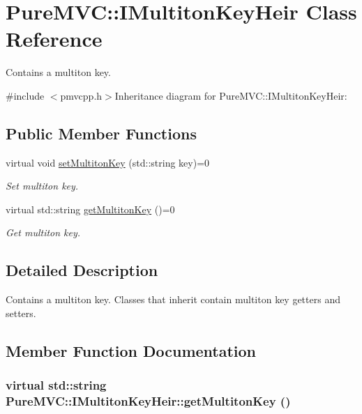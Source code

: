 \hypertarget{class_pure_m_v_c_1_1_i_multiton_key_heir}{
\section{PureMVC::IMultitonKeyHeir Class Reference}
\label{class_pure_m_v_c_1_1_i_multiton_key_heir}
}


Contains a multiton key.  


{\ttfamily \#include $<$pmvcpp.h$>$}Inheritance diagram for PureMVC::IMultitonKeyHeir:\subsection*{Public Member Functions}
\begin{DoxyCompactItemize}
\item 
virtual void \hyperlink{class_pure_m_v_c_1_1_i_multiton_key_heir_a03acb75ab79defba2c28b8de1bbe1ca6}{setMultitonKey} (std::string key)=0
\begin{DoxyCompactList}\small\item\em Set multiton key. \item\end{DoxyCompactList}\item 
virtual std::string \hyperlink{class_pure_m_v_c_1_1_i_multiton_key_heir_aecccfb9898368c6377550ceae5730934}{getMultitonKey} ()=0
\begin{DoxyCompactList}\small\item\em Get multiton key. \item\end{DoxyCompactList}\end{DoxyCompactItemize}


\subsection{Detailed Description}
Contains a multiton key. Classes that inherit contain multiton key getters and setters. 

\subsection{Member Function Documentation}
\hypertarget{class_pure_m_v_c_1_1_i_multiton_key_heir_aecccfb9898368c6377550ceae5730934}{
\subsubsection[{getMultitonKey}]{\setlength{\rightskip}{0pt plus 5cm}virtual std::string PureMVC::IMultitonKeyHeir::getMultitonKey ()}}
\label{class_pure_m_v_c_1_1_i_multiton_key_heir_aecccfb9898368c6377550ceae5730934}


